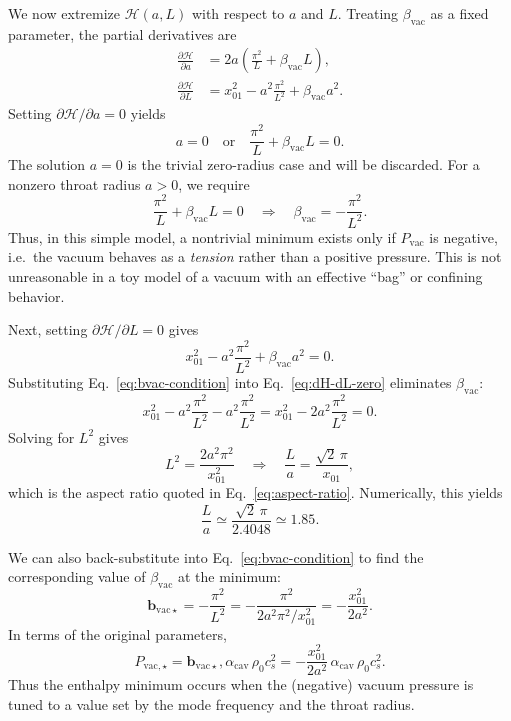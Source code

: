 \documentclass[11pt]{article}
\newcommand{\acav}{\alpha_{\mathrm{cav}}}
\newcommand{\bvac}{\beta_{\mathrm{vac}}}
\begin{document}
We now extremize $\mathcal{H}(a,L)$ with respect to $a$ and $L$.  Treating $\bvac$ as a fixed parameter, the partial derivatives are
\begin{align}
\frac{\partial \mathcal{H}}{\partial a}
&= 2a \left(\frac{\pi^2}{L} + \bvac L\right),
\\[4pt]
\frac{\partial \mathcal{H}}{\partial L}
&= x_{01}^2 - a^2 \frac{\pi^2}{L^2} + \bvac a^2.
\end{align}
Setting $\partial \mathcal{H}/\partial a = 0$ yields
\begin{equation}
a = 0
\quad\text{or}\quad
\frac{\pi^2}{L} + \bvac L = 0.
\end{equation}
The solution $a=0$ is the trivial zero-radius case and will be discarded.  For a nonzero throat radius $a>0$, we require
\begin{equation}
\frac{\pi^2}{L} + \bvac L = 0
\quad\Longrightarrow\quad
\bvac = -\frac{\pi^2}{L^2}.
\label{eq:bvac-condition}
\end{equation}
Thus, in this simple model, a nontrivial minimum exists only if $P_{\mathrm{vac}}$ is negative, i.e.\ the vacuum behaves as a \emph{tension} rather than a positive pressure.  This is not unreasonable in a toy model of a vacuum with an effective ``bag'' or confining behavior.

Next, setting $\partial \mathcal{H}/\partial L = 0$ gives
\begin{equation}
x_{01}^2 - a^2 \frac{\pi^2}{L^2} + \bvac a^2 = 0.
\label{eq:dH-dL-zero}
\end{equation}
Substituting Eq.~\eqref{eq:bvac-condition} into Eq.~\eqref{eq:dH-dL-zero} eliminates $\bvac$:
\begin{equation}
x_{01}^2 - a^2 \frac{\pi^2}{L^2}
           - a^2 \frac{\pi^2}{L^2}
= x_{01}^2 - 2 a^2 \frac{\pi^2}{L^2}
= 0.
\end{equation}
Solving for $L^2$ gives
\begin{equation}
L^2 = \frac{2 a^2 \pi^2}{x_{01}^2}
\quad\Longrightarrow\quad
\frac{L}{a} = \frac{\sqrt{2}\,\pi}{x_{01}},
\end{equation}
which is the aspect ratio quoted in Eq.~\eqref{eq:aspect-ratio}.  Numerically, this yields
\begin{equation}
\frac{L}{a} \simeq \frac{\sqrt{2}\,\pi}{2.4048} \simeq 1.85.
\end{equation}

We can also back-substitute into Eq.~\eqref{eq:bvac-condition} to find the corresponding value of $\bvac$ at the minimum:
\begin{equation}
\mathbf{b}_{\mathrm{vac}\star}
= -\frac{\pi^2}{L^2}
= -\frac{\pi^2}{2 a^2 \pi^2/x_{01}^2}
= -\frac{x_{01}^2}{2 a^2}.
\end{equation}
In terms of the original parameters,
\begin{equation}
P_{\mathrm{vac},\star}
= \mathbf{b}_{\mathrm{vac}\star},\acav\,\rho_0 c_s^2
= -\frac{x_{01}^2}{2 a^2}\,\acav\,\rho_0 c_s^2.
\end{equation}
Thus the enthalpy minimum occurs when the (negative) vacuum pressure is tuned to a value set by the mode frequency and the throat radius.
\end{document}
